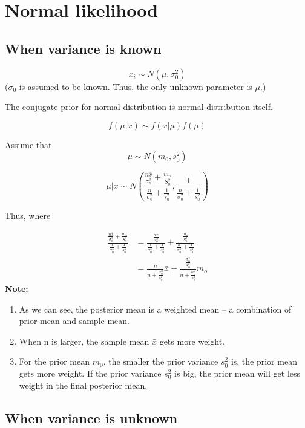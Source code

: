 \documentclass[]{book}
\begin{document}
\section{Normal likelihood}\label{normal-likelihood}

\subsection{When variance is known}\label{when-variance-is-known}

\[x_i \sim N(\mu, \sigma_0^2)\] (\(\sigma_0\) is assumed to be known.
Thus, the only unknown parameter is \(\mu\).)

The conjugate prior for normal distribution is normal distribution
itself.

\[f(\mu |x) \sim f(x|\mu) f(\mu)\]

Assume that \[\mu \sim N(m_0,s_0^2)\]

\[\mu|x \sim N(\frac{\frac{n \bar{x}}{\sigma_o^2}+\frac{m_o}{S_0^2}}{\frac{n}{\sigma_0^2}+\frac{1}{s_0^2}},\frac{1}{\frac{n}{\sigma_0^2}+\frac{1}{s_0^2}})\]

Thus, where

\[\begin{aligned} \frac{\frac{n \bar{x}}{\sigma_o^2}+\frac{m_o}{S_0^2}}{\frac{n}{\sigma_0^2}+\frac{1}{s_0^2}}&=\frac{\frac{n \bar{x}}{\sigma_o^2}}{\frac{n}{\sigma_0^2}+\frac{1}{s_0^2}}+\frac{\frac{m_o}{S_0^2}}{\frac{n}{\sigma_0^2}+\frac{1}{s_0^2}}\\ &=\frac{n}{n+\frac{\sigma_0^2}{s_0^2}} \bar{x}+\frac{\frac{\sigma_0^2}{S_0^2}}{n+\frac{\sigma_0^2}{s_0^2}}m_o \end{aligned}\]
\textbf{Note:}

\begin{enumerate}
\def\labelenumi{(\arabic{enumi})}
\item
  As we can see, the posterior mean is a weighted mean -- a combination
  of prior mean and sample mean.
\item
  When n is larger, the sample mean \(\bar{x}\) gets more weight.
\item
  For the prior mean \(m_0\), the smaller the prior variance \(s_0^2\)
  is, the prior mean gets more weight. If the prior variance \(s_0^2\)
  is big, the prior mean will get less weight in the final posterior
  mean.
\end{enumerate}

\subsection{When variance is unknown}\label{when-variance-is-unknown}
\end{document}
